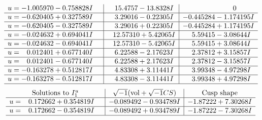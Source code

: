 \documentclass[1p]{elsarticle_modified}
\theoremstyle{definition}
\newcommand{\I}{\sqrt{-1}}
\begin{document}
$$\begin{array}{c|c|c}
\begin{aligned}
u &= -1.005970 - 0.758828 I\end{aligned}
 & \phantom{-}15.4757 - 13.8328 I & \phantom{-0.000000 } 0 \\ \hline\begin{aligned}
u &= -0.620405 + 0.327589 I\end{aligned}
 & \phantom{-}3.29016 - 0.22305 I & -0.445284 - 1.174195 I \\ \hline\begin{aligned}
u &= -0.620405 - 0.327589 I\end{aligned}
 & \phantom{-}3.29016 + 0.22305 I & -0.445284 + 1.174195 I \\ \hline\begin{aligned}
u &= -0.024632 + 0.694041 I\end{aligned}
 & \phantom{-}12.57310 + 5.42065 I & \phantom{-}5.59415 - 3.08644 I \\ \hline\begin{aligned}
u &= -0.024632 - 0.694041 I\end{aligned}
 & \phantom{-}12.57310 - 5.42065 I & \phantom{-}5.59415 + 3.08644 I \\ \hline\begin{aligned}
u &= \phantom{-}0.012401 + 0.677140 I\end{aligned}
 & \phantom{-}6.22588 - 2.17623 I & \phantom{-}2.37812 + 3.15857 I \\ \hline\begin{aligned}
u &= \phantom{-}0.012401 - 0.677140 I\end{aligned}
 & \phantom{-}6.22588 + 2.17623 I & \phantom{-}2.37812 - 3.15857 I \\ \hline\begin{aligned}
u &= -0.163278 + 0.512817 I\end{aligned}
 & \phantom{-}4.83308 + 3.11441 I & \phantom{-}3.99348 - 4.97298 I \\ \hline\begin{aligned}
u &= -0.163278 - 0.512817 I\end{aligned}
 & \phantom{-}4.83308 - 3.11441 I & \phantom{-}3.99348 + 4.97298 I\\
 \hline 
 \end{array}$$\newpage$$\begin{array}{c|c|c}  
\text{Solutions to }I^u_{1}& \I (\text{vol} + \sqrt{-1}CS) & \text{Cusp shape}\\
 \hline 
\begin{aligned}
u &= \phantom{-}0.172662 + 0.354819 I\end{aligned}
 & -0.089492 - 0.934789 I & -1.87222 + 7.30268 I \\ \hline\begin{aligned}
u &= \phantom{-}0.172662 - 0.354819 I\end{aligned}
 & -0.089492 + 0.934789 I & -1.87222 - 7.30268 I\\
 \hline 
 \end{array}$$\newpage
\end{document}
